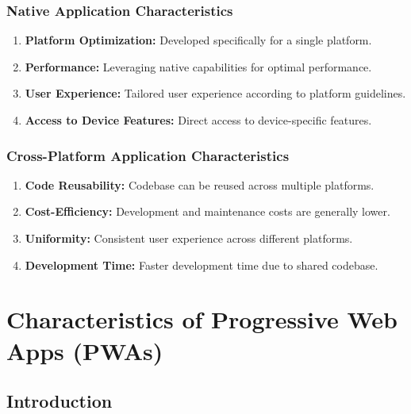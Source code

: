 \documentclass[12pt, a4paper, twoside]{article}
\begin{document}
\subsubsection{Native Application Characteristics}
\label{subsubsec:native-app-characteristics}

\begin{enumerate}
  \item \textbf{Platform Optimization:} Developed specifically for a single platform.
  
  \item \textbf{Performance:} Leveraging native capabilities for optimal performance.
  
  \item \textbf{User Experience:} Tailored user experience according to platform guidelines.
  
  \item \textbf{Access to Device Features:} Direct access to device-specific features.
\end{enumerate}

\subsubsection{Cross-Platform Application Characteristics}
\label{subsubsec:cross-platform-app-characteristics}

\begin{enumerate}
  \item \textbf{Code Reusability:} Codebase can be reused across multiple platforms.
  
  \item \textbf{Cost-Efficiency:} Development and maintenance costs are generally lower.
  
  \item \textbf{Uniformity:} Consistent user experience across different platforms.
  
  \item \textbf{Development Time:} Faster development time due to shared codebase.
\end{enumerate}

\newpage

\section{Characteristics of Progressive Web Apps (PWAs)}
\label{sec:pwa-characteristics}

\subsection{Introduction}
\label{subsec:pwa-intro}
\end{document}
